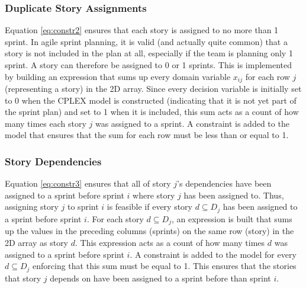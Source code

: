 \subsubsection{Duplicate Story Assignments}
Equation \ref{eq:constr2} ensures that each story is assigned to no more than 1 sprint. In agile sprint planning, it is valid (and actually quite common) that a story is not included in the plan at all, especially if the team is planning only 1 sprint. A story can therefore be assigned to 0 or 1 sprints. This is implemented by building an expression that sums up every domain variable $x_{ij}$ for each row $j$ (representing a story) in the 2D array. Since every decision variable is initially set to 0 when the CPLEX model is constructed (indicating that it is not yet part of the sprint plan) and set to 1 when it is included, this sum acts as a count of how many times each story $j$ was assigned to a sprint. A constraint is added to the model that ensures that the sum for each row must be less than or equal to 1.

\subsubsection{Story Dependencies}
Equation \ref{eq:constr3} ensures that all of story $j$'s dependencies have been assigned to a sprint before sprint $i$ where story $j$ has been assigned to. Thus, assigning story $j$ to sprint $i$ is feasible if every story $d \subseteq D_j$ has been assigned to a sprint before sprint $i$. For each story $d \subseteq D_j$, an expression is built that sums up the values in the preceding columns (sprints) on the same row (story) in the 2D array as story $d$. This expression acts as a count of how many times $d$ was assigned to a sprint before sprint $i$. A constraint is added to the model for every $d \subseteq D_j$ enforcing that this sum must be equal to 1. This ensures that the stories that story $j$ depends on have been assigned to a sprint before than sprint $i$.

